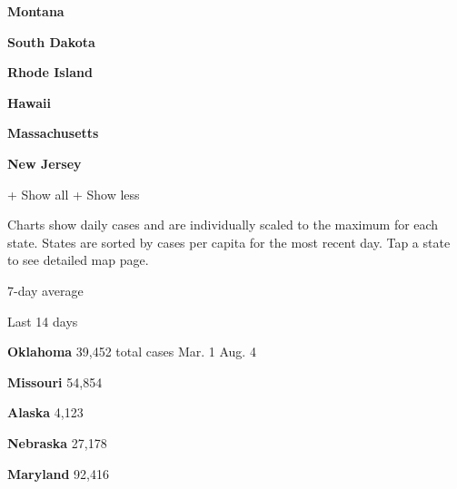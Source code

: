 \href{https://www.nytimes.com/interactive/2020/us/montana-coronavirus-cases.html}{}

\textbf{Montana}

\href{https://www.nytimes.com/interactive/2020/us/south-dakota-coronavirus-cases.html}{}

\textbf{South Dakota}

\href{https://www.nytimes.com/interactive/2020/us/rhode-island-coronavirus-cases.html}{}

\textbf{Rhode Island}

\href{https://www.nytimes.com/interactive/2020/us/hawaii-coronavirus-cases.html}{}

\textbf{Hawaii}

\href{https://www.nytimes.com/interactive/2020/us/massachusetts-coronavirus-cases.html}{}

\textbf{Massachusetts}

\href{https://www.nytimes.com/interactive/2020/us/new-jersey-coronavirus-cases.html}{}

\textbf{New Jersey}

+ Show all + Show less

Charts show daily cases and are individually scaled to the maximum for
each state. States are sorted by cases per capita for the most recent
day. Tap a state to see detailed map page.

\href{https://www.nytimes.com/interactive/2020/us/oklahoma-coronavirus-cases.html}{}

7-day average

Last 14 days

\textbf{Oklahoma} 39,452 total cases Mar. 1 Aug. 4

\href{https://www.nytimes.com/interactive/2020/us/missouri-coronavirus-cases.html}{}

\textbf{Missouri} 54,854

\href{https://www.nytimes.com/interactive/2020/us/alaska-coronavirus-cases.html}{}

\textbf{Alaska} 4,123

\href{https://www.nytimes.com/interactive/2020/us/nebraska-coronavirus-cases.html}{}

\textbf{Nebraska} 27,178

\href{https://www.nytimes.com/interactive/2020/us/maryland-coronavirus-cases.html}{}

\textbf{Maryland} 92,416

\href{https://www.nytimes.com/interactive/2020/us/puerto-rico-coronavirus-cases.html}{}

